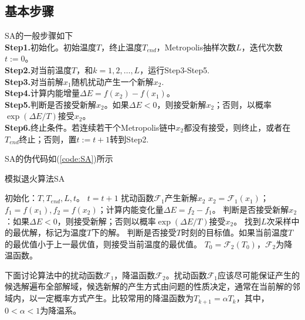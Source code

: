     \subsection{基本步骤}
        \par
        SA的一般步骤如下\\
        \textbf{Step1.}初始化。初始温度$T$，终止温度$T_{end}$，Metropolis抽样次数$L$，迭代次数$t:=0$。\\
        \textbf{Step2.}对当前温度$T$，和$k = 1,2,\dots,L$，运行Step3-Step5.\\
        \textbf{Step3.}对当前解$x_1$随机扰动产生一个新解$x_2$.\\
        \textbf{Step4.}计算内能增量$\Delta E = f(x_2)-f(x_1)$。\\
        \textbf{Step5.}判断是否接受新解$x_2$。如果$\Delta E <0$，则接受新解$x_2$；否则，以概率$\exp(\Delta E/T)$接受$x_2$。\\
        \textbf{Step6.}终止条件。若连续若干个Metropolis链中$x_2$都没有接受，则终止，或者在$T_{end}$终止；否则，置$t:=t+1$转到Step2.
        \par
        SA的伪代码如(\ref{code:SA})所示
        \begin{algorithm}[htbp]
            \caption{模拟退火算法SA}\label{code:SA}
            \begin{algorithmic}[1]
                \State 初始化：$T,T_{end},L,t$。
                    \State $t=t+1$
                        \State 扰动函数$\mathcal{F}_1$产生新解$x_2$  $x_2 = \mathcal{F}_1(x_1)$；$f_1 = f(x_1),f_2=f(x_2)$；计算内能变化量$\Delta E = f_2-f_1$。
                        \State 判断是否接受新解$x_2$：如果$\Delta E <0$，则接受新解；否则以概率$\exp(\Delta E/T)$接受$x_2$。
                    \EndFor
                    \State 找到$L$次采样中的最优解，标记为温度$T$下的解。
                    \State 判断是否接受$T$时刻的目标值。如果当前温度$T$的最优值小于上一最优值，则接受当前温度的最优值。
                    \State $T_0=\mathcal{F}_2(T_0)$，$\mathcal{F}_2$为降温函数。
                \EndWhile
            \end{algorithmic}
        \end{algorithm}
        \par
        下面讨论算法中的扰动函数$\mathcal{F}_1$，降温函数$\mathcal{F}_2$。扰动函数$\mathcal{F}_1$应该尽可能保证产生的候选解遍布全部解域，候选新解的产生方式由问题的性质决定，通常在当前解的邻域内，以一定概率方式产生。比较常用的降温函数为$T_{k+1} = \alpha T_k$，其中，$0<\alpha<1$为降温系。
